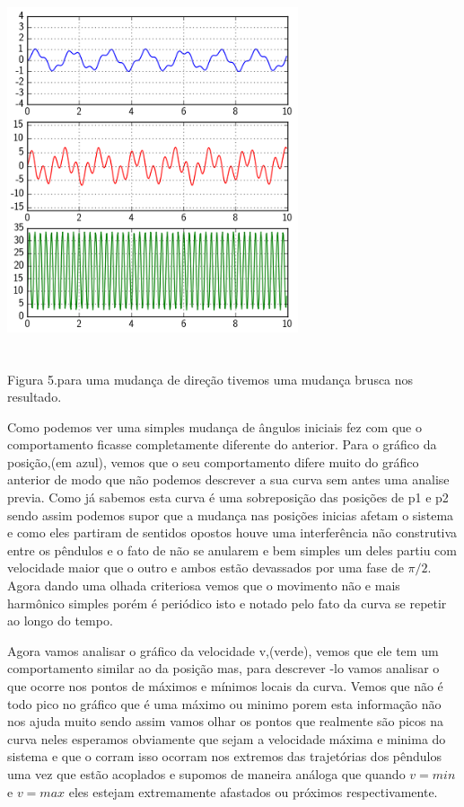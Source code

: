 \documentclass[a4paper]{article} %
\begin{document}
\begin{center}
	\includegraphics[width=3.38in,height=4.27in, keepaspectratio=false]{pendulo_acoplado2.PNG}
	
	\scriptsize {Figura 5.para uma mudança de direção tivemos uma mudança brusca nos resultado.}
\end{center}

Como podemos ver uma simples mudança de ângulos iniciais fez com que o comportamento ficasse completamente diferente do anterior. Para o gráfico da posição,(em azul), vemos que o seu comportamento difere muito do gráfico anterior de modo que não podemos descrever a sua curva sem antes uma analise previa. Como já sabemos esta curva é uma sobreposição das posições de p1 e p2 sendo assim podemos supor que a mudança nas posições inicias afetam o sistema e como eles partiram de sentidos opostos houve uma interferência não construtiva entre os pêndulos e o fato de não se anularem e bem simples um deles partiu com velocidade maior que o outro e ambos estão devassados por uma fase de $\pi/2$. Agora dando uma olhada criteriosa vemos que o movimento não e mais harmônico simples porém é periódico isto e notado pelo fato da curva se repetir ao longo do tempo.

Agora vamos analisar o gráfico da velocidade v,(verde), vemos que ele tem um comportamento similar ao da posição mas, para descrever -lo vamos analisar o que ocorre nos pontos de máximos e mínimos locais da curva. Vemos que não é todo pico no gráfico que é uma máximo ou minimo porem esta informação não nos ajuda muito sendo assim vamos olhar os pontos que realmente são picos na curva neles esperamos obviamente que sejam a velocidade máxima e minima do sistema e que o corram isso ocorram nos extremos das trajetórias dos pêndulos uma vez que estão acoplados e supomos de maneira análoga que quando $v = min$ e $v = max$ eles estejam extremamente afastados ou próximos respectivamente.
\end{document}
